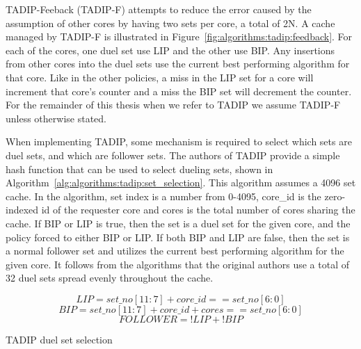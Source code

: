 TADIP-Feeback (TADIP-F) attempts to reduce the error caused by the assumption of other cores by having two sets per core, a total of 2N.
A cache managed by TADIP-F is illustrated in Figure~\ref{fig:algorithms:tadip:feedback}.
For each of the cores, one duel set use LIP and the other use BIP. 
Any insertions from other cores into the duel sets use the current best performing algorithm for that core.
Like in the other policies, a miss in the LIP set for a core will increment that core's counter and a miss the BIP set will decrement the counter.
For the remainder of this thesis when we refer to TADIP we assume TADIP-F unless otherwise stated.

When implementing TADIP, some mechanism is required to select which sets are duel sets, and which are follower sets.
The authors of TADIP provide a simple hash function that can be used to select dueling sets, shown in Algorithm~\ref{alg:algorithms:tadip:set_selection}.
This algorithm assumes a 4096 set cache.
In the algorithm, set index is a number from 0-4095, core\_id is the zero-indexed id of the requester core and cores is the total number of cores sharing the cache.
If BIP or LIP is true, then the set is a duel set for the given core, and the policy forced to either BIP or LIP.
If both BIP and LIP are false, then the set is a normal follower set and utilizes the current best performing algorithm for the given core.
It follows from the algorithms that the original authors use a total of 32 duel sets spread evenly throughout the cache.

\begin{algorithm}[ht]
\begin{equation}
LIP = set\_no[11:7] + core\_id == set\_no[6:0]
\end{equation}
\begin{equation}
BIP = set\_no[11:7] + core\_id + cores == set\_no[6:0]
\end{equation}
\begin{equation}
FOLLOWER = !LIP + !BIP
\end{equation}
\caption{TADIP duel set selection}
\label{alg:algorithms:tadip:set_selection}
\end{algorithm}

